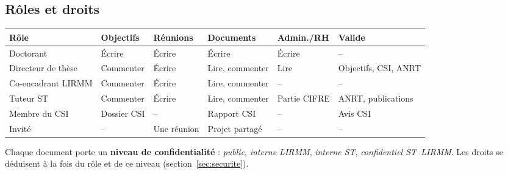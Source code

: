 \documentclass[11pt,a4paper]{article}
\begin{document}
\subsection{Rôles et droits}
\begin{center}\small\setlength{\tabcolsep}{4pt}
\begin{tabularx}{\linewidth}{P{2.6cm} P{2.0cm} P{1.8cm} P{2.1cm} P{1.8cm} L}
\toprule
\textbf{Rôle} & \textbf{Objectifs} & \textbf{Réunions} & \textbf{Documents} & \textbf{Admin./RH} & \textbf{Valide}\\
\midrule
Doctorant & Écrire & Écrire & Écrire & Écrire & --\\
Directeur de thèse & Commenter & Écrire & Lire, commenter & Lire & Objectifs, CSI, ANRT\\
Co-encadrant LIRMM & Commenter & Écrire & Lire, commenter & -- & --\\
Tuteur ST & Commenter & Écrire & Lire, commenter & Partie CIFRE & ANRT, publications\\
Membre du CSI & Dossier CSI & -- & Rapport CSI & -- & Avis CSI\\
Invité & -- & Une réunion & Projet partagé & -- & --\\
\bottomrule
\end{tabularx}
\end{center}

Chaque document porte un \textbf{niveau de confidentialité} : \emph{public},
\emph{interne LIRMM}, \emph{interne ST}, \emph{confidentiel ST--LIRMM}. Les droits se
déduisent à la fois du rôle et de ce niveau (section~\ref{sec:securite}).
\end{document}
